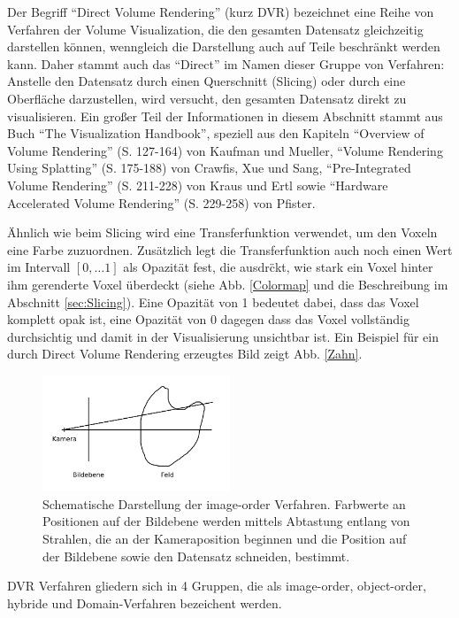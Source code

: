 \documentclass[a4paper,fontsize=12pt,toc=bib,halfparskip]{scrartcl}
\begin{document}
Der Begriff ``Direct Volume Rendering'' (kurz DVR) bezeichnet eine Reihe von Verfahren der Volume Visualization, die den gesamten Datensatz gleichzeitig darstellen k\"onnen, wenngleich die Darstellung auch auf Teile beschr\"ankt werden kann. Daher stammt auch das ``Direct'' im Namen dieser Gruppe von Verfahren: Anstelle den Datensatz durch einen Querschnitt (Slicing) oder durch eine Oberfl\"ache darzustellen, wird versucht, den gesamten Datensatz direkt zu visualisieren. Ein gro{\ss}er Teil der Informationen in diesem Abschnitt stammt aus Buch ``The Visualization Handbook''\cite{hansen2005visualization}, speziell aus den Kapiteln ``Overview of Volume Rendering'' (S. 127-164) von Kaufman und Mueller, ``Volume Rendering Using Splatting'' (S. 175-188) von Crawfis, Xue und Sang, ``Pre-Integrated Volume Rendering'' (S. 211-228) von Kraus und Ertl  sowie ``Hardware Accelerated Volume Rendering'' (S. 229-258) von Pfister.

\"Ahnlich wie beim Slicing wird eine Transferfunktion verwendet, um den Voxeln eine Farbe zuzuordnen. Zus\"atzlich legt die Transferfunktion auch noch einen Wert im Intervall $[0,\dots 1]$ als Opazit\"at fest, die ausdr\"ckt, wie stark ein Voxel hinter ihm gerenderte Voxel \"uberdeckt (siehe Abb. \ref{Colormap} und die Beschreibung im Abschnitt \ref{sec:Slicing}). Eine Opazit\"at von 1 bedeutet dabei, dass das Voxel komplett opak ist, eine Opazit\"at von 0 dagegen dass das Voxel vollst\"andig durchsichtig und damit in der Visualisierung unsichtbar ist. Ein Beispiel f\"ur ein durch Direct Volume Rendering erzeugtes Bild zeigt Abb. \ref{Zahn}. 

\begin{figure}
	\centering
	\includegraphics[width=0.5\textwidth]{pictures/DVR}
	\caption{Schematische Darstellung der image-order Verfahren. Farbwerte an Positionen auf der Bildebene werden mittels Abtastung entlang von Strahlen, die an der Kameraposition beginnen und die Position auf der Bildebene sowie den Datensatz schneiden, bestimmt.}
	\label{image-order}
\end{figure}

DVR Verfahren gliedern sich in 4 Gruppen, die als image-order, object-order, hybride und Domain-Verfahren bezeichent werden.
\end{document}
